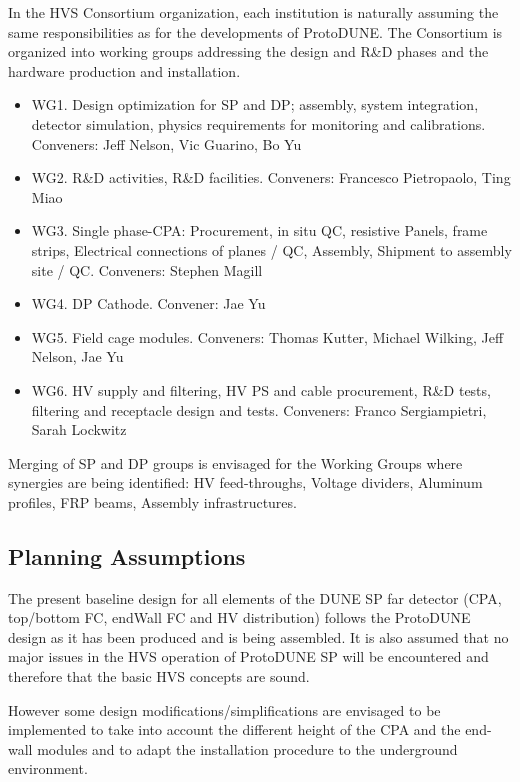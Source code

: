 In the HVS Consortium organization, each institution is naturally assuming the same responsibilities as for the developments of ProtoDUNE. The Consortium is organized into working groups addressing the design and  R\&D phases and the hardware production and installation.

\begin{itemize}
\item WG1. Design optimization for SP and DP; assembly, system integration, detector simulation, physics requirements for monitoring and calibrations. Conveners: Jeff Nelson, Vic Guarino, Bo Yu
\item WG2. R\&D activities, R\&D facilities. Conveners: Francesco Pietropaolo, Ting Miao
\item WG3. Single phase-CPA: Procurement, in situ QC, resistive Panels, frame strips, Electrical connections of planes / QC, Assembly, Shipment to assembly site / QC. Conveners: Stephen Magill
\item WG4. DP Cathode. Convener: Jae Yu
\item WG5. Field cage modules. Conveners: Thomas Kutter, Michael Wilking, Jeff Nelson, Jae Yu
\item WG6. HV supply and filtering, HV PS and cable procurement, R\&D tests, filtering and receptacle design and tests. Conveners: Franco Sergiampietri, Sarah Lockwitz
\end{itemize}

\noindent Merging of SP and DP groups is envisaged for the Working Groups where synergies are being identified: HV feed-throughs, Voltage dividers, Aluminum profiles, FRP beams, Assembly infrastructures.

\subsection{Planning Assumptions}
\label{sec:fdsp-hv-org-assmp}
The present baseline design for all elements of the DUNE SP far detector (CPA, top/bottom FC, endWall FC and HV distribution) follows the ProtoDUNE design as it has been produced and is being assembled.  It is also assumed that no major issues in the HVS operation of ProtoDUNE SP will be encountered and therefore that the basic HVS concepts are sound.

However some design modifications/simplifications are envisaged to be implemented to take into account the different height of the CPA  and the end-wall modules and to adapt the installation procedure to the underground environment.

